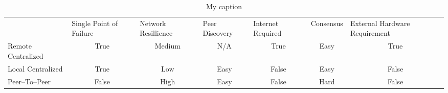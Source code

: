 \begin{table}[]
\centering
\caption{My caption}
\label{my-label}
\begin{tabular}{lcccccc}
                   & \multicolumn{1}{l}{Single Point of Failure} & \multicolumn{1}{l}{Network Resillience} & \multicolumn{1}{l}{Peer Discovery} & \multicolumn{1}{l}{Internet Required} & \multicolumn{1}{l}{Consensus} & \multicolumn{1}{l}{External Hardware Requirement} \\
Remote Centralized & True                                        & Medium                                  & N/A                                & True                                  & Easy                          & True                                              \\
Local Centralized  & True                                        & Low                                     & Easy                               & False                                 & Easy                          & False                                             \\
Peer--To--Peer     & False                                       & High                                    & Easy                               & False                                 & Hard                          & False                                            
\end{tabular}
\end{table}
